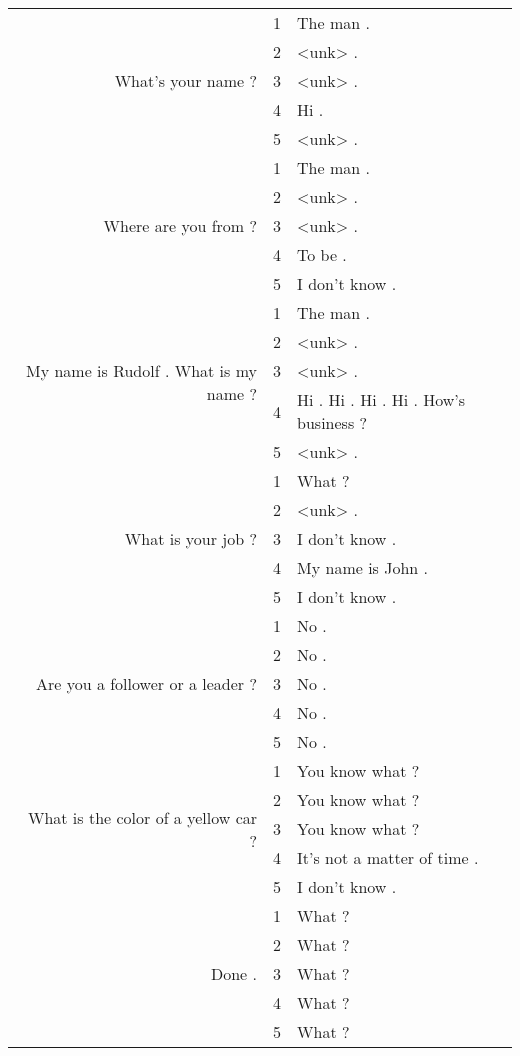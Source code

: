 \begin{longtable}{r|cl}
    \hline
    \multirow{5}{*}{What's your name ?} & 1 & The man .\\
    & 2 & <unk> .\\
    & 3 & <unk> .\\
    & 4 & Hi .\\
    & 5 & <unk> .\\

    \hline
    \multirow{5}{*}{Where are you from ?} & 1 & The man .\\
    & 2 & <unk> .\\
    & 3 & <unk> .\\
    & 4 & To be .\\
    & 5 & I don't know .\\

    \hline
    \multirow{5}{*}{My name is Rudolf . What is my name ?} & 1 & The man .\\
    & 2 & <unk> .\\
    & 3 & <unk> .\\
    & 4 & Hi . Hi . Hi . Hi . How's business ?\\
    & 5 & <unk> .\\

    \hline
    \multirow{5}{*}{What is your job ?} & 1 &  What ?\\
    & 2 & <unk> .\\
    & 3 & I don't know .\\
    & 4 & My name is John .\\
    & 5 & I don't know .\\

    \hline
    \multirow{5}{*}{Are you a follower or a leader ?} & 1 & No .\\
    & 2 & No .\\
    & 3 & No .\\
    & 4 & No .\\
    & 5 & No .\\

    \hline
    \multirow{5}{*}{What is the color of a yellow car ?} & 1 & You know what ?\\
    & 2 & You know what ?\\
    & 3 & You know what ?\\
    & 4 & It's not a matter of time .\\
    & 5 & I don't know .\\

    \hline
    \multirow{5}{*}{Done .} & 1 &  What ?\\
    & 2 & What ?\\
    & 3 & What ?\\
    & 4 & What ? \\
    & 5 & What ?\\


\end{longtable}
